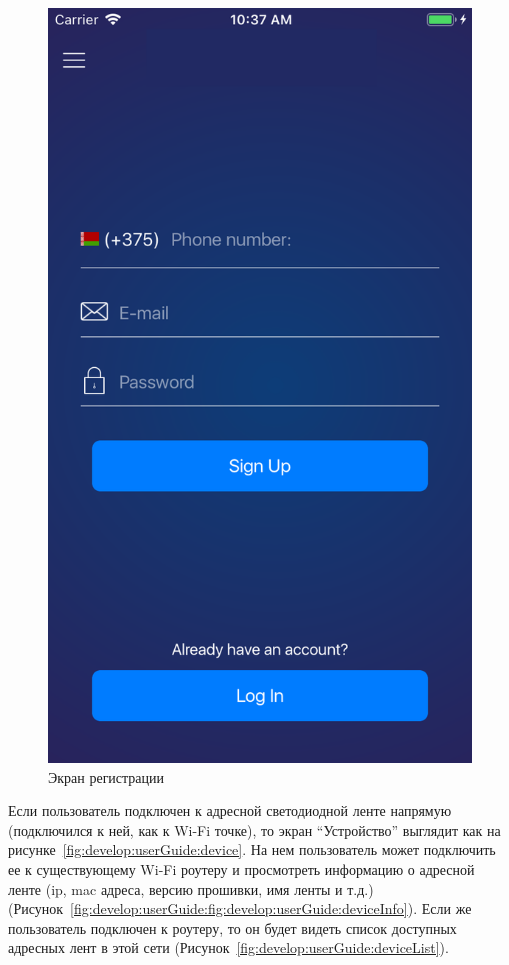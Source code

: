 \begin{figure}[H]
\centering
	\includegraphics[scale=0.2]{figures/userGuide/signUp.png}
	\caption{Экран регистрации}
	\label{fig:develop:userGuide:signUp}
\end{figure}

Если пользователь подключен к адресной светодиодной ленте напрямую (подключился к ней, как к Wi-Fi точке), то экран \enquote{Устройство} выглядит как на рисунке~\ref{fig:develop:userGuide:device}. На нем пользователь может подключить ее к существующему Wi-Fi роутеру и просмотреть информацию о адресной ленте (ip, mac адреса, версию прошивки, имя ленты и т.д.) (Рисунок~\ref{fig:develop:userGuide:fig:develop:userGuide:deviceInfo}). Если же пользователь подключен к роутеру, то он будет видеть список доступных адресных лент в этой сети (Рисунок~\ref{fig:develop:userGuide:deviceList}).

